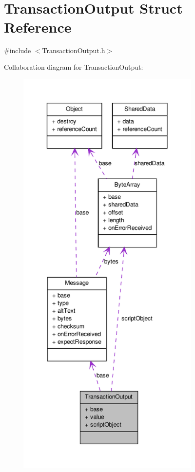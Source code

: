 \hypertarget{struct_transaction_output}{
\section{TransactionOutput Struct Reference}
\label{struct_transaction_output}
}


{\ttfamily \#include $<$TransactionOutput.h$>$}



Collaboration diagram for TransactionOutput:\nopagebreak
\begin{figure}[H]
\begin{center}
\leavevmode
\includegraphics[height=600pt]{struct_transaction_output__coll__graph}
\end{center}
\end{figure}
